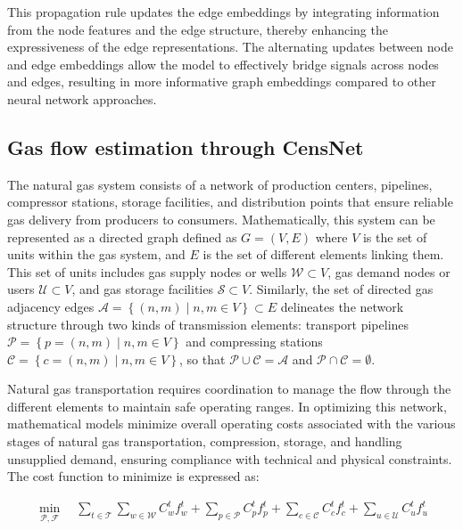 This propagation rule updates the edge embeddings by integrating information from the node features and the edge structure, thereby enhancing the expressiveness of the edge representations. The alternating updates between node and edge embeddings allow the model to effectively bridge signals across nodes and edges, resulting in more informative graph embeddings compared to other neural network approaches.




\subsection{Gas flow estimation through CensNet} \label{sec:LinealCensnet_formulation}

The natural gas system consists of a network of production centers, pipelines, compressor stations, storage facilities, and distribution points that ensure reliable gas delivery from producers to consumers. Mathematically, this system can be represented as a directed graph defined as $ G = (V, E)$ where $V$ is the set of units within the gas system, and $E$ is the set of different elements linking them. This set of units includes gas supply nodes or wells $\mathcal{W} \subset V$, gas demand nodes or users $\mathcal{U} \subset V$, and gas storage facilities $\mathcal{S} \subset V$. Similarly, the set of directed gas adjacency edges $\mathcal{A} = \left\{(n,m) \mid n,m\in V \right\} \subset E$ delineates the network structure through two kinds of transmission elements: transport pipelines $\mathcal{P} = \left\{p=(n,m) \mid n,m\in V \right\}$ and compressing stations $\mathcal{C} = \left\{c=(n,m) \mid n,m \in V \right\}$, so that $\mathcal{P}\cup\mathcal{C}=\mathcal{A}$ and $\mathcal{P}\cap\mathcal{C}=\emptyset$.

Natural gas transportation requires coordination to manage the flow through the different elements to maintain safe operating ranges. In optimizing this network, mathematical models minimize overall operating costs associated with the various stages of natural gas transportation, compression, storage, and handling unsupplied demand, ensuring compliance with technical and physical constraints. The cost function to minimize is expressed as:

\begin{equation} \label{eq:obj_func_linear_gas}
    \begin{split}
        \min_{\mathcal{P}, \mathcal{F}} \quad \sum_{t \in \mathcal{T}} \sum_{w \in \mathcal{W}} C_{w}^t {f_{w}^t} + \sum_{p \in \mathcal{P}} C_{p}^t {f_{p}^t} + \sum_{c \in \mathcal{C}} C_{c}^t {f_{c}^t} + \sum_{u \in \mathcal{U}} C_{u}^{t} {f_{u}^{t}} 
    \end{split}
\end{equation}


